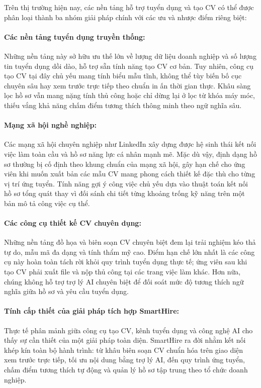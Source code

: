 Trên thị trường hiện nay, các nền tảng hỗ trợ tuyển dụng và tạo CV có thể được phân loại thành ba nhóm giải pháp chính với các ưu và nhược điểm riêng biệt:

\paragraph{Các nền tảng tuyển dụng truyền thống:}
Những nền tảng này sở hữu ưu thế lớn về lượng dữ liệu doanh nghiệp và số lượng tin tuyển dụng dồi dào, hỗ trợ sẵn tính năng tạo CV cơ bản. Tuy nhiên, công cụ tạo CV tại đây chủ yếu mang tính biểu mẫu tĩnh, không thể tùy biến bố cục chuyên sâu hay xem trước trực tiếp theo chuẩn in ấn thời gian thực. Khâu sàng lọc hồ sơ vẫn mang nặng tính thủ công hoặc chỉ dừng lại ở lọc từ khóa máy móc, thiếu vắng khả năng chấm điểm tương thích thông minh theo ngữ nghĩa sâu.

\paragraph{Mạng xã hội nghề nghiệp:}
Các mạng xã hội chuyên nghiệp như LinkedIn xây dựng được hệ sinh thái kết nối việc làm toàn cầu và hồ sơ năng lực cá nhân mạnh mẽ. Mặc dù vậy, định dạng hồ sơ thường bị cố định theo khung chuẩn của mạng xã hội, gây hạn chế cho ứng viên khi muốn xuất bản các mẫu CV mang phong cách thiết kế đặc thù cho từng vị trí ứng tuyển. Tính năng gợi ý công việc chủ yếu dựa vào thuật toán kết nối hồ sơ tổng quát thay vì đối sánh chi tiết từng khoảng trống kỹ năng trên một bản mô tả công việc cụ thể.

\paragraph{Các công cụ thiết kế CV chuyên dụng:}
Những nền tảng đồ họa và biên soạn CV chuyên biệt đem lại trải nghiệm kéo thả tự do, mẫu mã đa dạng và tính thẩm mỹ cao. Điểm hạn chế lớn nhất là các công cụ này hoàn toàn tách rời khỏi quy trình tuyển dụng thực tế; ứng viên sau khi tạo CV phải xuất file và nộp thủ công tại các trang việc làm khác. Hơn nữa, chúng không hỗ trợ trợ lý AI chuyên biệt để đối soát mức độ tương thích ngữ nghĩa giữa hồ sơ và yêu cầu tuyển dụng.

\paragraph{Tính cấp thiết của giải pháp tích hợp SmartHire:}
Thực tế phân mảnh giữa công cụ tạo CV, kênh tuyển dụng và công nghệ AI cho thấy sự cần thiết của một giải pháp toàn diện. SmartHire ra đời nhằm kết nối khép kín toàn bộ hành trình: từ khâu biên soạn CV chuẩn hóa trên giao diện xem trước trực tiếp, tối ưu nội dung bằng trợ lý AI, đến quy trình ứng tuyển, chấm điểm tương thích tự động và quản lý hồ sơ tập trung theo tổ chức doanh nghiệp.

